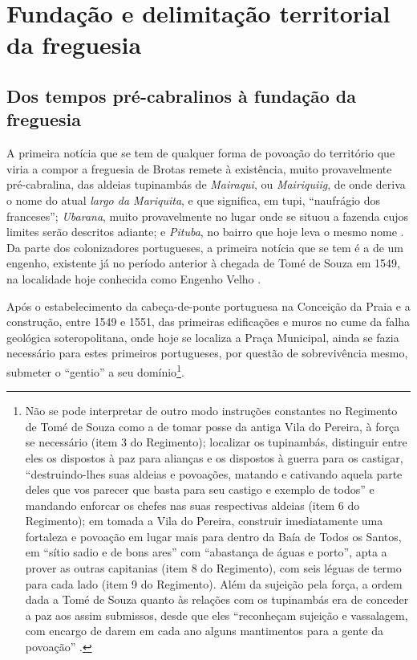 \section{Fundação e delimitação territorial da freguesia}\label{sec:2.1}

\subsection{Dos tempos pré-cabralinos à fundação da freguesia}\label{subsec:precabral}

A primeira notícia que se tem de qualquer forma de povoação do território que viria a compor a freguesia de Brotas remete à existência, muito provavelmente pré-cabralina, das aldeias tupinambás de \textit{Mairaqui}, ou \textit{Mairiquiig}, de onde deriva o nome do atual \textit{largo da Mariquita}, e que significa, em tupi, ``naufrágio dos franceses''; \textit{Ubarana}, muito provavelmente no lugar onde se situou a fazenda cujos limites serão descritos adiante; e \textit{Pituba}, no bairro que hoje leva o mesmo nome \cite{azevedo_povoamento_1969,dorea_ruas_1999,sampaio_salvador_2016,VASCONCELOS2002}. Da parte dos colonizadores portugueses, a primeira notícia que se tem é a de um engenho, existente já no período anterior à chegada de Tomé de Souza em 1549, na localidade hoje conhecida como Engenho Velho \cite[p.~235]{sampaio_salvador_2016}.

Após o estabelecimento da cabeça-de-ponte portuguesa na Conceição da Praia e a construção, entre 1549 e 1551, das primeiras edificações e muros no cume da falha geológica soteropolitana, onde hoje se localiza a Praça Municipal, ainda se fazia necessário para estes primeiros portugueses, por questão de sobrevivência mesmo, submeter o ``gentio'' a seu domínio\footnote{Não se pode interpretar de outro modo instruções constantes no Regimento de Tomé de Souza como a de tomar posse da antiga Vila do Pereira, à força se necessário (item 3 do Regimento); localizar os tupinambás, distinguir entre eles os dispostos à paz para alianças e os dispostos à guerra para os castigar, ``destruindo-lhes suas aldeias e povoações, matando e cativando aquela parte deles que vos parecer que basta para seu castigo e exemplo de todos'' e mandando enforcar os chefes nas suas respectivas aldeias (item 6 do Regimento); em tomada a Vila do Pereira, construir imediatamente uma fortaleza e povoação em lugar mais para dentro da Baía de Todos os Santos, em ``sítio sadio e de bons ares'' com ``abastança de águas e porto'', apta a prover as outras capitanias (item 8 do Regimento), com seis léguas de termo para cada lado (item 9 do Regimento). Além da sujeição pela força, a ordem dada a Tomé de Souza quanto às relações com os tupinambás era de conceder a paz aos assim submissos, desde que eles ``reconheçam sujeição e vassalagem, com encargo de darem em cada ano alguns mantimentos para a gente da povoação'' \cite[pp.~81-101]{ruy_politica_1949}.}.


